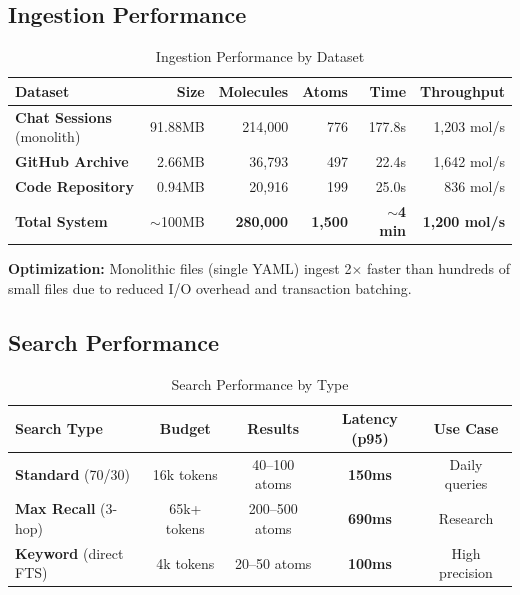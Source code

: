\documentclass[11pt]{article}
\begin{document}
\subsection{Ingestion Performance}

\begin{table}[h]
\centering
\caption{Ingestion Performance by Dataset}
\label{tab:ingestion}
\begin{tabular}{@{}lrrrrr@{}}
\toprule
\textbf{Dataset} & \textbf{Size} & \textbf{Molecules} & \textbf{Atoms} & \textbf{Time} & \textbf{Throughput} \\ \midrule
\textbf{Chat Sessions} (monolith) & 91.88MB & 214,000 & 776 & 177.8s & 1,203 mol/s \\
\textbf{GitHub Archive} & 2.66MB & 36,793 & 497 & 22.4s & 1,642 mol/s \\
\textbf{Code Repository} & 0.94MB & 20,916 & 199 & 25.0s & 836 mol/s \\
\textbf{Total System} & $\sim$100MB & \textbf{280,000} & \textbf{1,500} & \textbf{$\sim$4 min} & \textbf{1,200 mol/s} \\ \bottomrule
\end{tabular}
\end{table}

\textbf{Optimization:} Monolithic files (single YAML) ingest 2$\times$ faster than hundreds of small files due to reduced I/O overhead and transaction batching.

\subsection{Search Performance}

\begin{table}[h]
\centering
\caption{Search Performance by Type}
\label{tab:search}
\begin{tabular}{@{}lcccc@{}}
\toprule
\textbf{Search Type} & \textbf{Budget} & \textbf{Results} & \textbf{Latency (p95)} & \textbf{Use Case} \\ \midrule
\textbf{Standard} (70/30) & 16k tokens & 40--100 atoms & \textbf{150ms} & Daily queries \\
\textbf{Max Recall} (3-hop) & 65k+ tokens & 200--500 atoms & \textbf{690ms} & Research \\
\textbf{Keyword} (direct FTS) & 4k tokens & 20--50 atoms & \textbf{100ms} & High precision \\ \bottomrule
\end{tabular}
\end{table}
\end{document}
